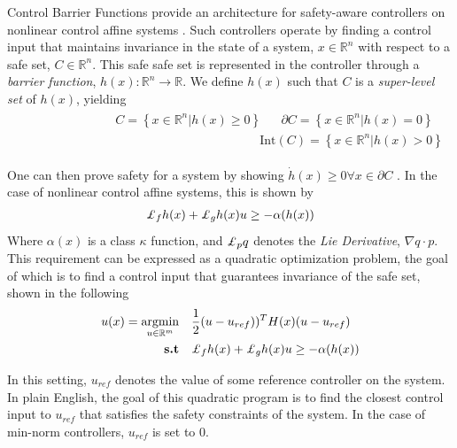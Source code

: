 Control Barrier Functions provide an architecture for safety-aware controllers on nonlinear control affine systems \Cite{Ames1}. Such controllers operate by finding a control input that maintains invariance in the state of a system, $x \in \mathbb{R}^n$ with respect to a safe set, $C \in \mathbb{R}^n$. This safe safe set is represented in the controller through a \textit{barrier function}, $h(x) : \mathbb{R}^n \rightarrow \mathbb{R}$. We define $h(x)$ such that $C$ is a \textit{super-level set} of $h(x)$, yielding
\begin{align}
\begin{split}
    C = \left \{ x \in \mathbb{R}^n | h(x) \geq 0 \right \} 
\end{split}
\begin{split}
\end{split}
\begin{split}
    \partial C = \left \{ x \in \mathbb{R}^n | h(x) = 0 \right \}
\end{split}
\begin{split}
\end{split}
\begin{split}
    \text{Int}(C) = \left \{ x \in \mathbb{R}^n | h(x) > 0 \right \}
\end{split}
\end{align}

\noindent One can then prove safety for a system by showing $\dot{h}(x) \geq 0 \forall x \in \partial C$ \Cite{nagumo_1942}. In the case of nonlinear control affine systems, this is shown by
\begin{align}
    \Lie_f h(x) + \Lie_g h(x)u \geq -\alpha(h(x))
\end{align}
\noindent Where $\alpha(x)$ is a class $\kappa$ function, and $\Lie_p q$ denotes the \textit{Lie Derivative}, $\nabla q \cdot p$. \newline
This requirement can be expressed as a quadratic optimization problem, the goal of which is to find a control input that guarantees invariance of the safe set, shown in the following
\begin{align} \label{eqn:CBF-CLF-QP}
    u(x) = \argmin_{u \in \mathbb{R}^{m}} \quad &\frac{1}{2}(u - u_{ref}))^TH(x)(u - u_{ref})\\
    \textbf{s.t} \quad  &\Lie_f h(x) + \Lie_g h(x)u \geq -\alpha(h(x)) \nonumber
\end{align}

\noindent In this setting, $u_{ref}$ denotes the value of some reference controller on the system. In plain English, the goal of this quadratic program is to find the closest control input to $u_{ref}$ that satisfies the safety constraints of the system. In the case of min-norm controllers, $u_{ref}$ is set to 0. \newline

